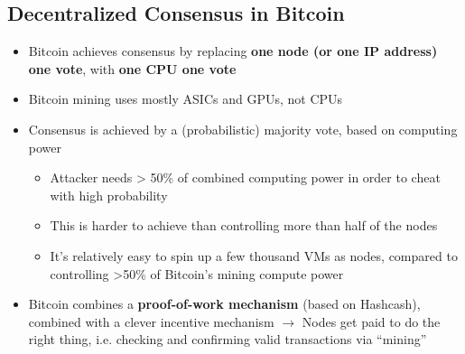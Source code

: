 \subsection{Decentralized Consensus in Bitcoin}
\begin{itemize}
	\item Bitcoin achieves consensus by replacing \textbf{one node (or one IP address) one vote}, with \textbf{one CPU one vote}
	\item Bitcoin mining uses mostly ASICs and GPUs, not CPUs
	\item Consensus is achieved by a (probabilistic) majority vote, based on computing power
	\begin{itemize}
		\item Attacker needs > 50\% of combined computing power in order to cheat with high probability
		\item This is harder to achieve than controlling more than half of the nodes
		\item It's relatively easy to spin up a few thousand VMs as nodes, compared to controlling >50\% of Bitcoin's mining compute power
	\end{itemize}
	\item Bitcoin combines a \textbf{proof-of-work mechanism} (based on Hashcash), combined with a clever incentive mechanism $\rightarrow$ Nodes get paid to do the right thing, i.e. checking and confirming valid transactions via ``mining''
\end{itemize}

